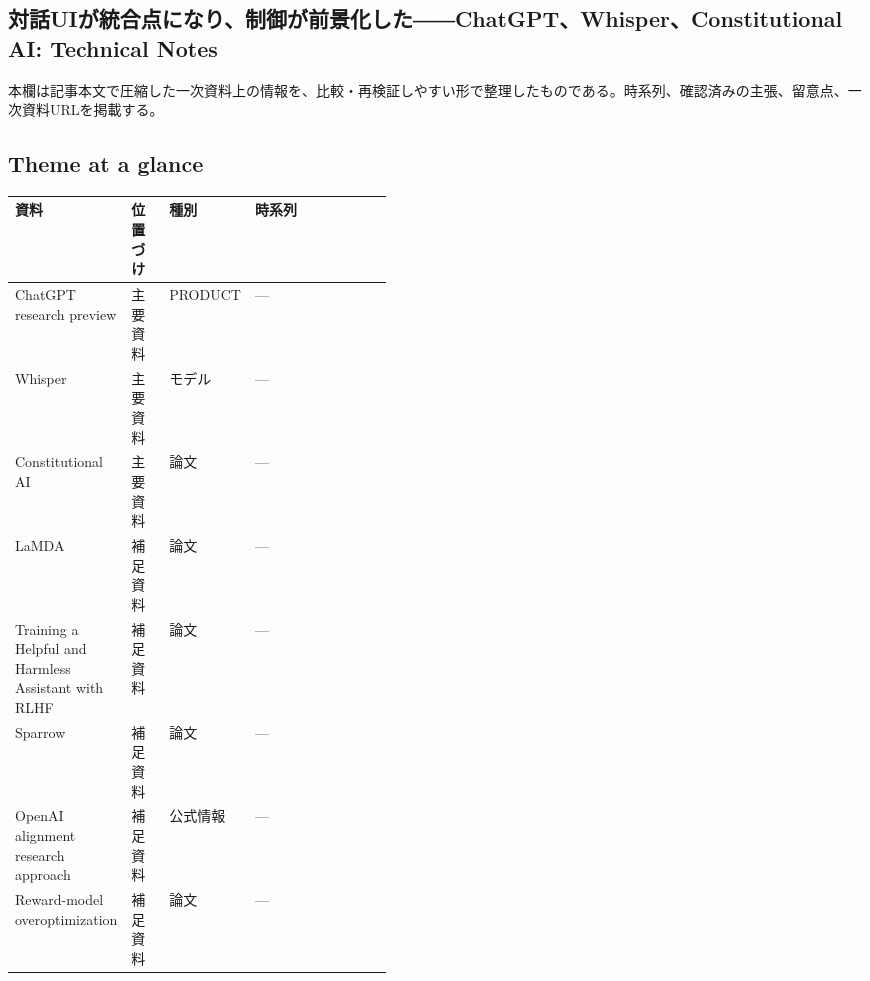 \subsection*{対話UIが統合点になり、制御が前景化した――ChatGPT、Whisper、Constitutional AI: Technical Notes}
本欄は記事本文で圧縮した一次資料上の情報を、比較・再検証しやすい形で整理したものである。時系列、確認済みの主張、留意点、一次資料URLを掲載する。
\medskip
\subsection*{Theme at a glance}
\begin{center}
\footnotesize
\begin{tabularx}{\linewidth}{@{}p{0.20\linewidth}p{0.10\linewidth}p{0.14\linewidth}X@{}}
\toprule
資料 & 位置づけ & 種別 & 時系列 \\
\midrule
ChatGPT research preview & 主要資料 & PRODUCT & — \\
Whisper & 主要資料 & モデル & — \\
Constitutional AI & 主要資料 & 論文 & — \\
LaMDA & 補足資料 & 論文 & — \\
Training a Helpful and Harmless Assistant with RLHF & 補足資料 & 論文 & — \\
Sparrow & 補足資料 & 論文 & — \\
OpenAI alignment research approach & 補足資料 & 公式情報 & — \\
Reward-model overoptimization & 補足資料 & 論文 & — \\
\bottomrule
\end{tabularx}
\end{center}
\normalsize


